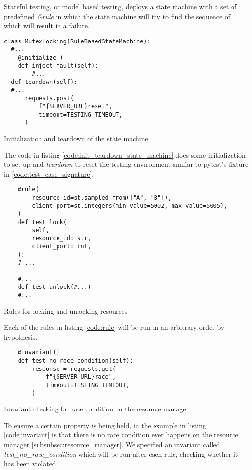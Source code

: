 Stateful testing, or model based testing, deploys a state machine with a set of 
predefined \textit{@rule} in which the state machine will try to find the sequence
of which will result in a failure.

\begin{listing}[!ht]
  \begin{verbatim}
class MutexLocking(RuleBasedStateMachine):
  #... 
    @initialize()
    def inject_fault(self):
        #...
  def teardown(self):
  #...
      requests.post(
          f"{SERVER_URL}reset",
          timeout=TESTING_TIMEOUT,
      )
 \end{verbatim}
 \caption{Initialization and teardown of the state machine}
 \label{code:init_teardown_state_machine}
\end{listing}

The code in listing \ref{code:init_teardown_state_machine} does some initialization to set
up and \textit{teardown} to reset the testing environment similar to pytest's fixture 
in \ref{code:test_case_signature}.

\begin{listing}[!ht]
  \begin{verbatim}
    @rule(
        resource_id=st.sampled_from(["A", "B"]),
        client_port=st.integers(min_value=5002, max_value=5005),
    )
    def test_lock(
        self,
        resource_id: str,
        client_port: int,
    ):
    # ...

    #... 
    def test_unlock(#...)
    #... 
  \end{verbatim}
  \caption{Rules for locking and unlocking resources}
  \label{code:rule}
\end{listing}

Each of the rules in listing \ref{code:rule} will be run in an arbitrary order by hypothesis.

\begin{listing}[!ht]
  \begin{verbatim}
    @invariant()
    def test_no_race_condition(self):
        response = requests.get(
            f"{SERVER_URL}race",
            timeout=TESTING_TIMEOUT,
        )
  \end{verbatim}
  \caption{Invariant checking for race condition on the resource manager}
  \label{code:invariant}
\end{listing}

To ensure a certain property is being held, in the example in listing \ref{code:invariant} is that there is 
no race condition ever happens on the resource manager \ref{subsubsec:resource_manager}.
We specified an invariant called \textit{test\_no\_race\_condition} which will be run 
after each rule, checking whether it has been violated.

